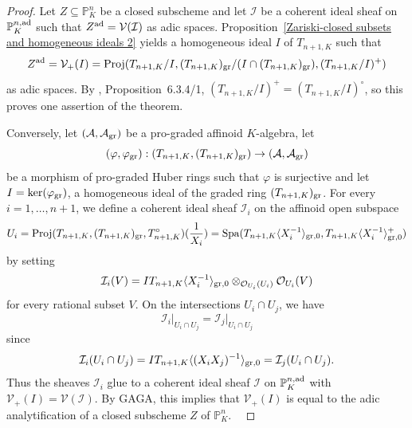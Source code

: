 \documentclass[12pt,twoside,a4paper]{article}
\theoremstyle{definition}
\theoremstyle{remark}
\newcommand\ad{{\rm ad}}
\newcommand\gr{{\rm gr}}
\newcommand\Proj{{\rm Proj}}
\newcommand\Spa{{\rm Spa}}
\begin{document}
\begin{proof}Let $Z\subseteq \mathbb{P}_{K}^{n}$ be a closed subscheme and let $\mathcal{I}$ be a coherent ideal sheaf on $\mathbb{P}_{K}^{n,\ad}$ such that $Z^{\ad}=\mathcal{V}(\mathcal{I})$ as adic spaces. Proposition~\ref{Zariski-closed subsets and homogeneous ideals 2} yields a homogeneous ideal $I$ of $T_{n+1, K}$ such that \begin{equation*}Z^{\ad}=\mathcal{V}_{+}(I)=\Proj(T_{n+1, K}/I, (T_{n+1, K})_{\gr}/(I\cap (T_{n+1, K})_{\gr}), (T_{n+1, K}/I)^{+})\end{equation*}as adic spaces. By \cite{BGR}, Proposition~6.3.4/1, $(T_{n+1, K}/I)^{+}=(T_{n+1, K}/I)^{\circ}$, so this proves one assertion of the theorem.

Conversely, let $(\mathcal{A}, \mathcal{A}_{\gr})$ be a pro-graded affinoid $K$-algebra, let \begin{equation*}(\varphi, \varphi_{\gr}): (T_{n+1, K}, (T_{n+1, K})_{\gr})\to (\mathcal{A}, \mathcal{A}_{\gr})\end{equation*}be a morphism of pro-graded Huber rings such that $\varphi$ is surjective and let $I=\ker(\varphi_{\gr})$, a homogeneous ideal of the graded ring $(T_{n+1, K})_{\gr}$. For every $i=1,\dots, n+1$, we define a coherent ideal sheaf $\mathcal{I}_{i}$ on the affinoid open subspace \begin{equation*}U_{i}=\Proj(T_{n+1, K}, (T_{n+1, K})_{\gr}, T_{n+1, K}^{\circ})(\frac{1}{X_{i}})=\Spa(T_{n+1, K}\langle X_{i}^{-1}\rangle_{\gr, 0}, T_{n+1, K}\langle X_{i}^{-1}\rangle_{\gr, 0}^{+})\end{equation*}by setting \begin{equation*}\mathcal{I}_{i}(V)=IT_{n+1, K}\langle X_{i}^{-1}\rangle_{\gr, 0}\otimes_{\mathcal{O}_{U_{i}}(U_{i})}\mathcal{O}_{U_{i}}(V)\end{equation*}for every rational subset $V$. On the intersections $U_{i}\cap U_{j}$, we have \begin{equation*}\mathcal{I}_{i}\vert_{U_{i}\cap U_{j}}=\mathcal{I}_{j}\vert_{U_{i}\cap U_{j}}\end{equation*}since \begin{equation*}\mathcal{I}_{i}(U_{i}\cap U_{j})=IT_{n+1, K}\langle (X_{i}X_{j})^{-1}\rangle_{\gr, 0}=\mathcal{I}_{j}(U_{i}\cap U_{j}).\end{equation*}Thus the sheaves $\mathcal{I}_{i}$ glue to a coherent ideal sheaf $\mathcal{I}$ on $\mathbb{P}_{K}^{n,\ad}$ with $\mathcal{V}_{+}(I)=\mathcal{V}(\mathcal{I})$. By GAGA, this implies that $\mathcal{V}_{+}(I)$ is equal to the adic analytification of a closed subscheme $Z$ of $\mathbb{P}_{K}^{n}$.  \end{proof}






 

\end{document}
